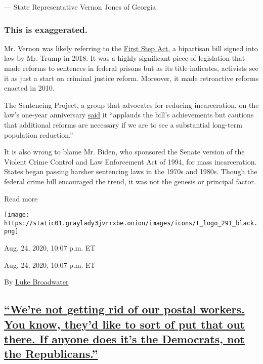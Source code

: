 --- State Representative Vernon Jones of Georgia

\hypertarget{this-is-exaggerated--3}{%
\subsubsection{\texorpdfstring{\textbf{This is exaggerated.}
}{This is exaggerated. }}\label{this-is-exaggerated--3}}

Mr. Vernon was likely referring to the
\href{https://www.brennancenter.org/our-work/research-reports/what-first-step-act-and-whats-happening-it}{First
Step Act}, a bipartisan bill signed into law by Mr. Trump in 2018. It
was a highly significant piece of legislation that made reforms to
sentences in federal prisons but as its title indicates, activists see
it as just a start on criminal justice reform. Moreover, it made
retroactive reforms enacted in 2010.

The Sentencing Project, a group that advocates for reducing
incarceration, on the law's one-year anniversary
\href{https://www.sentencingproject.org/publications/one-year-after-the-first-step-act/}{said}
it ``applauds the bill's achievements but cautions that additional
reforms are necessary if we are to see a substantial long-term
population reduction.''

It is also wrong to blame Mr. Biden, who sponsored the Senate version of
the Violent Crime Control and Law Enforcement Act of 1994, for mass
incarceration. States began passing harsher sentencing laws in the 1970s
and 1980s. Though the federal crime bill encouraged the trend, it was
not the genesis or principal factor.

Read more

\texttt{[image: https://static01.graylady3jvrrxbe.onion/images/icons/t\_logo\_291\_black.png]}

Aug. 24, 2020, 10:07 p.m. ET

Aug. 24, 2020, 10:07 p.m. ET

By \href{https://www.nytimes3xbfgragh.onion/by/luke-broadwater}{Luke
Broadwater}

\hypertarget{were-not-getting-rid-of-our-postal-workers-you-know-theyd-like-to-sort-of-put-that-out-there-if-anyone-does-its-the-democrats-not-the-republicans}{%
\subsection{\texorpdfstring{\protect\hyperlink{were-not-getting-rid-of-our-postal-workers-you-know-theyd-like-to-sort-of-put-that-out-there-if-anyone-does-its-the-democrats-no}{``We're
not getting rid of our postal workers. You know, they'd like to sort of
put that out there. If anyone does it's the Democrats, not the
Republicans.''}}{``We're not getting rid of our postal workers. You know, they'd like to sort of put that out there. If anyone does it's the Democrats, not the Republicans.''}}\label{were-not-getting-rid-of-our-postal-workers-you-know-theyd-like-to-sort-of-put-that-out-there-if-anyone-does-its-the-democrats-not-the-republicans}}


